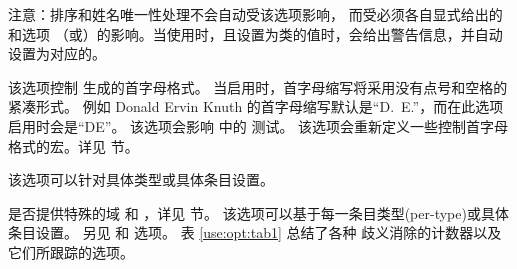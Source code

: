 \begin{optionlist}

注意：排序和姓名唯一性处理不会自动受该选项影响，
而受必须各自显式给出的和选项
（或）的影响。当使用时，且设置为类的值时，会给出警告信息，并自动设置为对应的。





该选项控制 \biblatex 生成的首字母格式。
当启用时，首字母缩写将采用没有点号和空格的紧凑形式。
例如 Donald Ervin Knuth 的首字母缩写默认是“D.~E.”，而在此选项启用时会是“DE”。
该选项会影响  中的  测试。
该选项会重新定义一些控制首字母格式的宏。详见  节。

该选项可以针对具体类型或具体条目设置。



是否提供特殊的域  和 ，详见  节。
该选项可以基于每一条目类型(per-type)或具体条目设置。
另见  和  选项。
表 \ref{use:opt:tab1} 总结了各种  歧义消除的计数器以及它们所跟踪的选项。


\end{optionlist}
